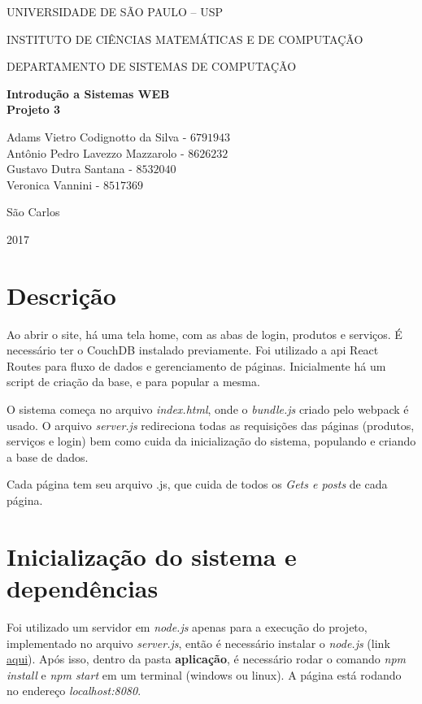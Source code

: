 \documentclass[10pt,a4paper]{article}
\newcommand*\NewPage{\newpage\null\thispagestyle{empty}\newpage}
\begin{document}
\thispagestyle{empty}
\begin{center}
	UNIVERSIDADE DE SÃO PAULO – USP
	
	INSTITUTO DE CIÊNCIAS MATEMÁTICAS E DE COMPUTAÇÃO
	
	DEPARTAMENTO DE SISTEMAS DE COMPUTAÇÃO
	
	\vspace{7cm}
	
	\Large{\textbf{Introdução a Sistemas WEB}}\\
	\small{\textbf{Projeto 3}}
	
	\vspace{6cm}
	
	Adams Vietro Codignotto da Silva - $6791943$ \\ 
	Antônio Pedro Lavezzo Mazzarolo - $8626232$ \\
	Gustavo Dutra Santana - $8532040$\\
	Veronica Vannini - $8517369$\\
	
	\vspace{6cm}
	
	São Carlos
	
	2017
\end{center}

\NewPage
{}

\tableofcontents

\newpage

\section{Descrição}
Ao abrir o site, há uma tela home, com as abas de login, produtos e serviços. É necessário ter o CouchDB instalado previamente. Foi utilizado a api React Routes para fluxo de dados e gerenciamento de páginas. Inicialmente há um script de criação da base, e para popular a mesma.

O sistema começa no arquivo \textit{index.html}, onde o \textit{bundle.js} criado pelo webpack é usado. O arquivo \textit{server.js} redireciona todas as requisições das páginas (produtos, serviços e login) bem como cuida da inicialização do sistema, populando e criando a base de dados.

Cada página tem seu arquivo .js, que cuida de todos os \textit{Gets e posts} de cada página.

\section{Inicialização do sistema e dependências}
Foi utilizado um servidor em \textit{node.js} apenas para a execução do projeto, implementado no arquivo \textit{server.js}, então é necessário instalar o \textit{node.js} (link \href{https://nodejs.org/en/}{aqui}). Após isso, dentro da pasta \textbf{aplicação}, é necessário rodar o comando \textit{npm install} e \textit{npm start} em um terminal (windows ou linux). A página está rodando no endereço \textit{localhost:8080}.
\end{document}
